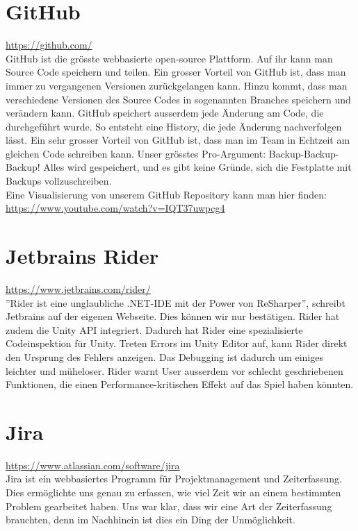 \section{GitHub}
\url{https://github.com/}\\
GitHub ist die grösste webbasierte open-source Plattform. Auf ihr kann man Source Code speichern und teilen. Ein grosser Vorteil von GitHub ist, dass man immer zu vergangenen Versionen zurückgelangen kann.
Hinzu kommt, dass man verschiedene Versionen des Source Codes in sogenannten Branches speichern und verändern kann. GitHub speichert ausserdem jede Änderung am Code, die durchgeführt wurde. So entsteht eine History, die jede Änderung nachverfolgen lässt. 
Ein sehr grosser Vorteil von GitHub ist, dass man im Team in Echtzeit am gleichen Code schreiben kann. Unser grösstes Pro-Argument: Backup-Backup-Backup!
Alles wird gespeichert, und es gibt keine Gründe, sich die Festplatte mit Backups vollzuschreiben. \\
Eine Visualisierung von unserem \gls{GitHub Repository} kann man hier finden: \url{https://www.youtube.com/watch?v=IQT37uwpcg4}


\section{Jetbrains Rider}
\url{https://www.jetbrains.com/rider/}\\
''Rider ist eine unglaubliche .NET-IDE mit der Power von ReSharper'', schreibt Jetbrains auf der eigenen Webseite. Dies können wir nur bestätigen. Rider hat zudem die Unity API integriert. Dadurch hat Rider eine
spezialisierte Codeinspektion für Unity. Treten Errors im Unity Editor auf, kann Rider direkt den Ursprung des Fehlers anzeigen. Das Debugging ist dadurch um einiges leichter und müheloser. 
Rider warnt User ausserdem vor schlecht geschriebenen Funktionen, die einen Performance-kritischen Effekt auf das Spiel haben könnten. 


\section{Jira}
\url{https://www.atlassian.com/software/jira}\\
Jira ist ein webbasiertes Programm für Projektmanagement und Zeiterfassung. Dies ermöglichte uns genau zu erfassen, wie viel Zeit wir an einem bestimmten Problem gearbeitet haben. Uns war klar, dass wir eine Art 
der Zeiterfassung brauchten, denn im Nachhinein ist dies ein Ding der Unmöglichkeit.

